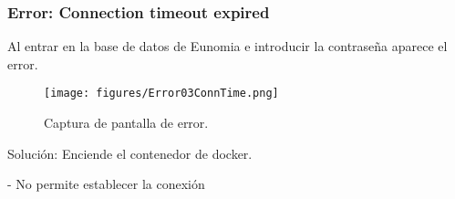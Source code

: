 \subsubsection{Error: Connection timeout expired}
Al entrar en la base de datos de Eunomia e introducir la contraseña aparece el error.

    \begin{figure}[H]
    \centering
    \texttt{[image: figures/Error03ConnTime.png]}
     \caption{Captura de pantalla de error.}
    \label{fig:Error03ConnTime}
    \end{figure}

Solución: Enciende el contenedor de docker.

- No permite establecer la conexión

 